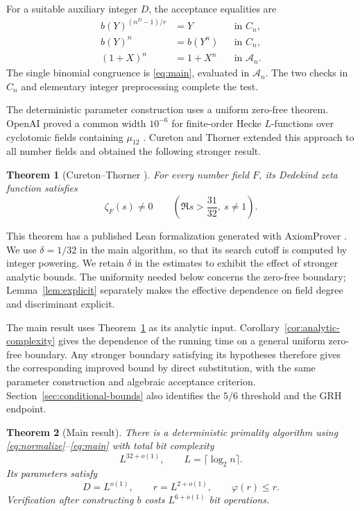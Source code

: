 \documentclass[11pt]{article}
\newtheorem{theorem}{Theorem}[section]
\theoremstyle{definition}
\theoremstyle{remark}
\newcommand{\A}{\mathcal A}
\begin{document}
For a suitable auxiliary integer $D$, the acceptance equalities are
\begin{align}
 b(Y)^{(n^D-1)/r}&=Y &&\text{in } C_n,\label{eq:normalize}\\
 b(Y)^n&=b(Y^n) &&\text{in } C_n,\label{eq:compat}\\
 (1+X)^n&=1+X^n &&\text{in }\A_n.\label{eq:main}
\end{align}
The single binomial congruence is \eqref{eq:main}, evaluated in
$\A_n$. The two checks in $C_n$ and elementary integer preprocessing
complete the test.

The deterministic parameter construction uses a uniform zero-free
theorem. OpenAI proved a common width $10^{-6}$ for finite-order
Hecke $L$-functions over cyclotomic fields containing $\mu_{12}$
\cite[Theorem 1.2]{openai-artin}. Cureton and Thorner extended this
approach to all number fields and obtained the following stronger
result.

\begin{theorem}[Cureton--Thorner {\cite[Theorem 1.1]{cureton-thorner}}]
\label{thm:zero-free}
For every number field $F$, its Dedekind zeta function satisfies
\[
 \zeta_F(s)\ne0\qquad
 \left(\Re s>\frac{31}{32},\ s\ne1\right).
\]
\end{theorem}

This theorem has a published Lean formalization generated with
AxiomProver \cite{axiom-lean}. We use $\delta=1/32$ in the main
algorithm, so that its search cutoff is computed by integer powering.
We retain $\delta$ in the estimates to exhibit the effect of stronger
analytic bounds. The uniformity needed below concerns the zero-free
boundary; Lemma~\ref{lem:explicit} separately makes the effective
dependence on field degree and discriminant explicit.

The main result uses Theorem~\ref{thm:zero-free} as its analytic
input. Corollary~\ref{cor:analytic-complexity} gives the dependence
of the running time on a general uniform zero-free boundary.
Any stronger boundary satisfying its hypotheses therefore gives
the corresponding improved bound by direct substitution, with
the same parameter construction and algebraic acceptance criterion.
Section~\ref{sec:conditional-bounds} also identifies the $5/6$
threshold and the GRH endpoint.

\begin{theorem}[Main result]\label{thm:main}
There is a deterministic primality algorithm
using \eqref{eq:normalize}--\eqref{eq:main} with total bit complexity
\[
 L^{32+o(1)},\qquad L=\lceil\log_2 n\rceil.
\]
Its parameters satisfy
\[
 D=L^{o(1)},\qquad r=L^{2+o(1)},\qquad
 \varphi(r)\le r.
\]
Verification after constructing $b$ costs $L^{6+o(1)}$ bit operations.
\end{theorem}
\end{document}

